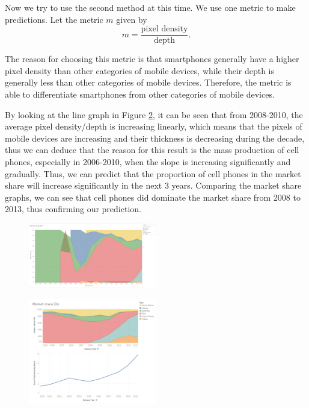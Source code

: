 \documentclass[conference]{IEEEtran}
\begin{document}
Now we try to use the second method at this time. We use one metric to make predictions. Let the metric $m$ given by
\[ m = \frac{\text{pixel density}}{\text{depth}}. \]

The reason for choosing this metric is that smartphones generally have a higher pixel density than other categories of mobile devices, while their depth is generally less than other categories of mobile devices. Therefore, the metric is able to differentiate smartphones from other categories of mobile devices.

By looking at the line graph in Figure \ref{fig:pixel}, it can be seen that from 2008-2010, the average pixel density/depth is increasing linearly, which means that the pixels of mobile devices are increasing and their thickness is decreasing during the decade, thus we can deduce that the reason for this result is the mass production of cell phones, especially in 2006-2010, when the slope is increasing significantly and gradually. Thus, we can predict that the proportion of cell phones in the market share will increase significantly in the next 3 years. Comparing the market share graphs, we can see that cell phones did dominate the market share from 2008 to 2013, thus confirming our prediction.

\begin{figure}
    \centering
    \includegraphics[width=0.5\textwidth]{../Visualisations/C/Market share 2010.png}
    \caption{}
    \label{fig:market-2010}
\end{figure}

\begin{figure}
    \centering
    \includegraphics[width=0.5\textwidth]{../Visualisations/C/Piexel density.png}
    \caption{}
    \label{fig:pixel}
\end{figure}
\end{document}
